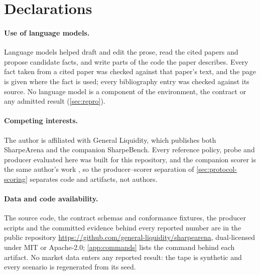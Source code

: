 \section{Declarations}\label{sec:declarations}

\paragraph{Use of language models.} Language models helped draft and edit the prose, read the cited papers and propose candidate facts, and write parts of the code the paper describes. Every fact taken from a cited paper was checked against that paper's text, and the page is given where the fact is used; every bibliography entry was checked against its source. No language model is a component of the environment, the contract or any admitted result (\cref{sec:repro}).

\paragraph{Competing interests.} The author is affiliated with General Liquidity, which publishes both SharpeArena and the companion SharpeBench. Every reference policy, probe and producer evaluated here was built for this repository, and the companion scorer is the same author's work \citep{toca2026sharpebench}, so the producer--scorer separation of \cref{sec:protocol-scoring} separates code and artifacts, not authors.

\paragraph{Data and code availability.} The source code, the contract schemas and conformance fixtures, the producer scripts and the committed evidence behind every reported number are in the public repository \url{https://github.com/general-liquidity/sharpearena}, dual-licensed under MIT or Apache-2.0; \cref{app:commands} lists the command behind each artifact. No market data enters any reported result: the tape is synthetic and every scenario is regenerated from its seed.
